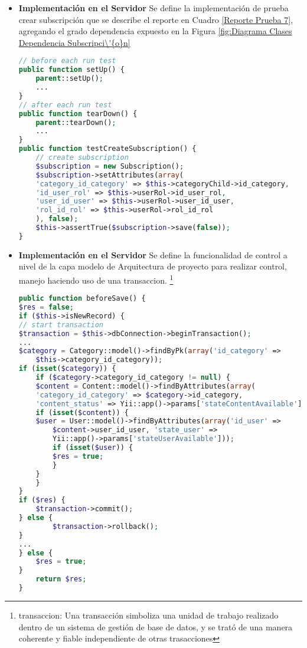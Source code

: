 \begin{itemize}

\item \textbf{Implementaci\'{o}n en el Servidor}
Se define la implementaci\'{o}n de prueba crear subscripci\'{o}n que se describe
el reporte en Cuadro \ref{Reporte Prueba 7}, agregando el grado dependencia
expuesto en la Figura \ref{fig:Diagrama Clases Dependencia Subscripci\'{o}n}

\begin{lstlisting}[language = PHP]
// before each run test
public function setUp() {
    parent::setUp();
    ...
}
// after each run test
public function tearDown() {
    parent::tearDown();
    ...
}
public function testCreateSubscription() {
    // create subscription
    $subscription = new Subscription();
    $subscription->setAttributes(array(
    'category_id_category' => $this->categoryChild->id_category,
    'id_user_rol' => $this->userRol->id_user_rol,
    'user_id_user' => $this->userRol->user_id_user,
    'rol_id_rol' => $this->userRol->rol_id_rol
    ), false);
    $this->assertTrue($subscription->save(false));
}
\end{lstlisting}

\item \textbf{Implementaci\'{o}n en el Servidor}
Se define la funcionalidad de control a nivel de la capa modelo de Arquitectura
de proyecto para realizar control, manejo haciendo uso de una transaccion. 
\footnote{transaccion: Una transacci\'{o}n simboliza una unidad de trabajo 
realizado dentro de un sistema de gesti\'{o}n de base de datos, y se trat\'{o}
de una manera coherente y fiable independiente de otras trasacciones}

\begin{lstlisting}[language = PHP]
public function beforeSave() {
$res = false;
if ($this->isNewRecord) {
// start transaction
$transaction = $this->dbConnection->beginTransaction();
...
$category = Category::model()->findByPk(array('id_category' => 
    $this->category_id_category));
if (isset($category)) {
    if ($category->category_id_category != null) {
    $content = Content::model()->findByAttributes(array(
    'category_id_category' => $category->id_category, 
    'content_status' => Yii::app()->params['stateContentAvailable']));
    if (isset($content)) {
    $user = User::model()->findByAttributes(array('id_user' => 
        $content->user_id_user, 'state_user' => 
        Yii::app()->params['stateUserAvailable']));
        if (isset($user)) {
        $res = true;
        }
    }
    }
}
if ($res) {
    $transaction->commit();
} else {
        $transaction->rollback();
}
...
} else {
    $res = true;
}
    return $res;
}
\end{lstlisting}

\end{itemize}

